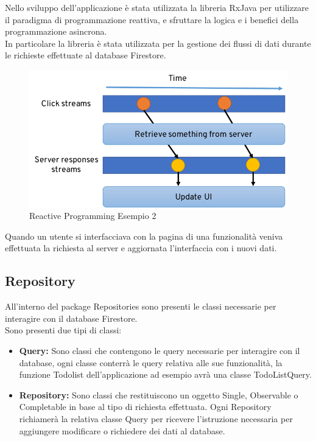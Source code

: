Nello sviluppo dell'applicazione è stata utilizzata la libreria RxJava per utilizzare il paradigma di programmazione reattiva, e sfruttare la logica e i benefici della programmazione asincrona.\\
In particolare la libreria è stata utilizzata per la gestione dei flussi di dati durante le richieste effettuate al database Firestore.

\begin{figure}[!hb]
  \centering
  \includegraphics[width=1\textwidth]{immagini/reactive_programming_es2.png}
  \caption{Reactive Programming Esempio 2}\label{fig:Reactive Programming Esempio 2}
\end{figure}
Quando un utente si interfacciava con la pagina di una funzionalità veniva effettuata la richiesta al server e aggiornata l'interfaccia con i nuovi dati.
\newpage



\subsection{Repository}
All'interno del package Repositories sono presenti le classi necessarie per interagire con il database Firestore.\\
Sono presenti due tipi di classi:
\begin{itemize}
    \item \textbf{Query:} Sono classi che contengono le query necessarie per interagire con il database, ogni classe conterrà le query relativa alle sue funzionalità, la funzione Todolist dell'applicazione ad esempio avrà una classe TodoListQuery.
    \item \textbf{Repository:} Sono classi che restituiscono un oggetto Single, Observable o Completable in base al tipo di richiesta effettuata. Ogni Repository richiamerà la relativa classe Query per ricevere l'istruzione necessaria per aggiungere modificare o richiedere dei dati al database.
\end{itemize}

